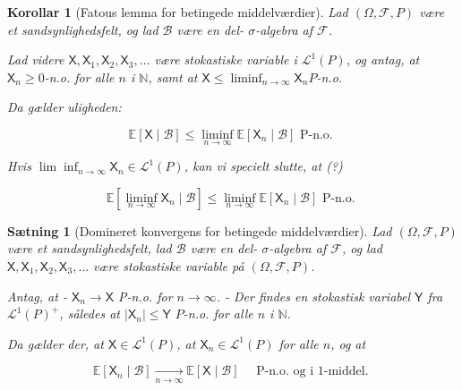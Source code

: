 \documentclass{article}
\newcommand{\1}{\mathbbm{1}}
\newcommand{\X}{\mathsf{X}}
\newcommand{\Y}{\mathsf{Y}}
\theoremstyle{boxed}
\newtheorem{corollary}[theorem]{Korollar}
\newtheorem{proposition}[theorem]{Sætning}
\begin{document}
\begin{theorem-box}
    \begin{corollary}[Fatous lemma for betingede middelværdier]
        Lad $(\Omega, \mathcal{F}, P)$ være et sandsynlighedsfelt, og lad $\mathcal{B}$ være en del- $\sigma$-algebra af $\mathcal{F}$.

Lad videre $\X, \X_1, \X_2, \X_3, \ldots$ være stokastiske variable i $\mathcal{L}^1(P)$, og antag, at $\X_n \geq 0$-n.o. for alle $n$ i $\mathbb{N}$, samt at $\X \leq \liminf _{n \rightarrow \infty} \X_n P$-n.o.

Da gælder uligheden:

$$
\mathbb{E}[\X \mid \mathcal{B}] \leq \liminf _{n \rightarrow \infty} \mathbb{E}\left[\X_n \mid \mathcal{B}\right] \text { P-n.o. }
$$


Hvis $\lim \inf _{n \rightarrow \infty} \X_n \in \mathcal{L}^1(P)$, kan vi specielt slutte, at (?)

$$
\mathbb{E}\left[\liminf _{n \rightarrow \infty} \X_n \mid \mathcal{B}\right] \leq \liminf _{n \rightarrow \infty} \mathbb{E}\left[\X_n \mid \mathcal{B}\right] \text { P-n.o. }
$$

    \end{corollary}
\end{theorem-box}
\begin{theorem-box}
    \begin{proposition}[Domineret konvergens for betingede middelværdier]
        Lad $(\Omega, \mathcal{F}, P)$ være et sandsynlighedsfelt, lad $\mathcal{B}$ være en del- $\sigma$-algebra af $\mathcal{F}$, og lad $\X, \X_1, \X_2, \X_3, \ldots$ være stokastiske variable på $(\Omega, \mathcal{F}, P)$.

Antag, at
- $\X_n \rightarrow \X$ P-n.o. for $n \rightarrow \infty$.
- Der findes en stokastisk variabel $\Y$ fra $\mathcal{L}^1(P)^{+}$, således at $\left|\X_n\right| \leq \Y$ $P$-n.o. for alle $n$ i $\mathbb{N}$.

Da gælder der, at $\X \in \mathcal{L}^1(P)$, at $\X_n \in \mathcal{L}^1(P)$ for alle $n$, og at

$$
\mathbb{E}\left[\X_n \mid \mathcal{B}\right] \underset{n \rightarrow \infty}{\longrightarrow} \mathbb{E}[\X \mid \mathcal{B}] \quad \text { P-n.o. og i 1-middel. }
$$
    \end{proposition}
\end{theorem-box}
\end{document}
